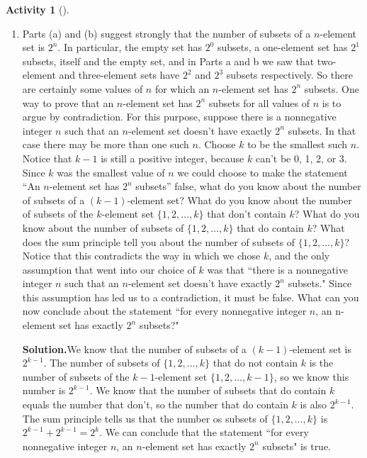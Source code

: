 \documentclass[10pt,]{book}
\theoremstyle{plain}
\theoremstyle{definition}
\newtheorem{activity}[project]{Activity}
\numberwithin{equation}{chapter}
\begin{document}
\begin{activity}[]
\begin{enumerate}[label=(\alph*)]
~\par
\item Parts (a) and (b) suggest strongly that the number of subsets of a \(n\)-element set is \(2^n\). In particular, the empty set has \(2^0\) subsets, a one-element set has \(2^1\) subsets, itself and the empty set, and in Parts a and b we saw that two-element and three-element sets have \(2^2\) and \(2^3\) subsets respectively. So there are certainly some values of \(n\) for which an \(n\)-element set has \(2^n\) subsets. One way to prove that an \(n\)-element set has \(2^n\) subsets for all values of \(n\) is to argue by contradiction. For this purpose, suppose there is a nonnegative integer \(n\) such that an \(n\)-element set doesn't have exactly \(2^n\) subsets. In that case there may be more than one such \(n\). Choose \(k\) to be the smallest such \(n\). Notice that \(k -1\) is still a positive integer, because \(k\) can't be 0, 1, 2, or 3. Since \(k\) was the smallest value of \(n\) we could choose to make the statement ``An \(n\)-element set has \(2^n\) subsets'' false, what do you know about the number of subsets of a \((k - 1)\)-element set? What do you know about the number of subsets of the \(k\)-element set \(\{ 1, 2, \ldots, k \}\) that don't contain \(k\)? What do you know about the number of subsets of \(\{ 1,
2, \ldots,  k \}\) that do contain \(k\)? What does the sum principle tell you about the number of subsets of \(\{ 1, 2, \ldots, k \}\)? Notice that this contradicts the way in which we chose \(k\), and the only assumption that went into our choice of \(k\) was that ``there is a nonnegative integer \(n\) such that an \(n\)-element set doesn't have exactly \(2^n\) subsets." Since this assumption has led us to a contradiction, it must be false. What can you now conclude about the statement ``for every nonnegative integer \(n\), an n-element set has exactly \(2^n\) subsets?"%
\par\medskip\noindent%
\textbf{Solution.}\quad We know that the number of subsets of a \((k-1)\)-element set is \(2^{k-1}\). The number of subsets of \(\{1,2,\ldots,k\}\) that do not contain \(k\) is the number of subsets of the \(k-1\)-element set \(\{1,2,\ldots,
k-1\}\), so we know this number is \(2^{k-1}\). We know that the number of subsets that do contain \(k\) equals the number that don't, so the number that do contain \(k\) is also \(2^{k-1}\). The sum principle tells us that the number os subsets of \(\{1,2,\ldots, k\}\) is \(2^{k-1}+2^{k-1}=2^k\). We can conclude that the statement ``for every nonnegative integer \(n\), an \(n\)-element set has exactly \(2^n\) subsets" is true.%

\end{enumerate}
\end{activity}
\end{document}
